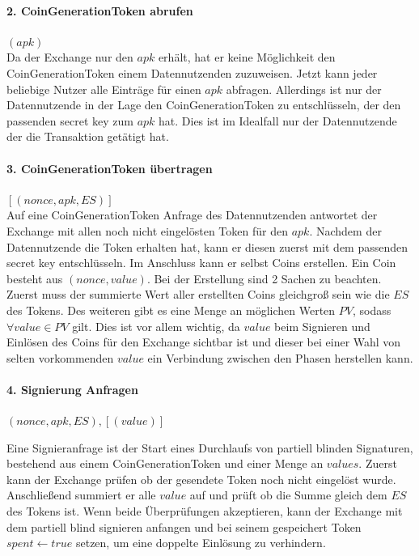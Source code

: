 \documentclass[11pt,a4paper]{scrreprt}
\begin{document}
\paragraph{2. CoinGenerationToken abrufen} $(apk)$\\
Da der Exchange nur den $apk$ erhält, hat er keine Möglichkeit den CoinGenerationToken einem Datennutzenden zuzuweisen. Jetzt kann jeder beliebige Nutzer alle Einträge für einen $apk$ abfragen. Allerdings ist nur der Datennutzende in der Lage den CoinGenerationToken zu entschlüsseln, der den passenden secret key zum $apk$ hat. Dies ist im Idealfall nur der Datennutzende der die Transaktion getätigt hat.

\paragraph{3. CoinGenerationToken übertragen} $[(nonce, apk, ES)]$\\
Auf eine CoinGenerationToken Anfrage des Datennutzenden antwortet der Exchange mit allen noch nicht eingelösten Token für den $apk$. Nachdem der Datennutzende die Token erhalten hat, kann er diesen zuerst mit dem passenden secret key entschlüsseln. Im Anschluss kann er selbst Coins erstellen. Ein Coin besteht aus $(nonce, value)$. Bei der Erstellung sind 2 Sachen zu beachten. Zuerst muss der summierte Wert aller erstellten Coins gleichgroß sein wie die $ES$ des Tokens. Des weiteren gibt es eine Menge an möglichen Werten $PV$, sodass $\forall value\in  PV$ gilt. Dies ist vor allem wichtig, da $value$ beim Signieren und Einlösen des Coins für den Exchange sichtbar ist und dieser bei einer Wahl von selten vorkommenden $value$ ein Verbindung zwischen den Phasen herstellen kann.

\paragraph{4. Signierung Anfragen} $(nonce, apk, ES), [(value)]$

Eine Signieranfrage ist der Start eines Durchlaufs von partiell blinden Signaturen, bestehend aus einem CoinGenerationToken und einer Menge an $values$. Zuerst kann der Exchange prüfen ob der gesendete Token noch nicht eingelöst wurde. Anschließend summiert er alle $value$ auf und prüft ob die Summe gleich dem $ES$ des Tokens ist. Wenn beide Überprüfungen akzeptieren, kann der Exchange mit dem partiell blind signieren anfangen und bei seinem gespeichert Token $spent \leftarrow true$ setzen, um eine doppelte Einlösung zu verhindern.
\end{document}
